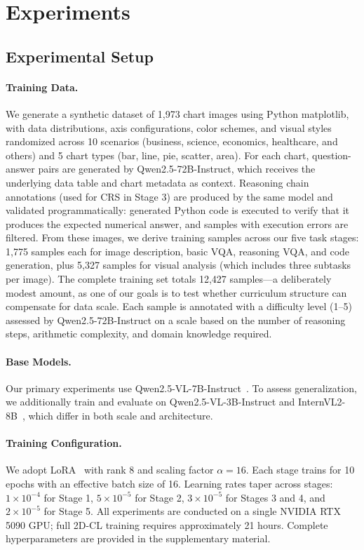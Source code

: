 ﻿\documentclass[journal]{IEEEtran}
\newcommand{\method}{2D-CL}
\newcommand{\crs}{CRS}
\begin{document}
\section{Experiments}
\subsection{Experimental Setup}
\label{sec:setup}
\paragraph{Training Data.}
We generate a synthetic dataset of 1,973 chart images using Python matplotlib, with data distributions, axis configurations, color schemes, and visual styles randomized across 10 scenarios (business, science, economics, healthcare, and others) and 5 chart types (bar, line, pie, scatter, area). For each chart, question-answer pairs are generated by Qwen2.5-72B-Instruct, which receives the underlying data table and chart metadata as context. Reasoning chain annotations (used for \crs{} in Stage 3) are produced by the same model and validated programmatically: generated Python code is executed to verify that it produces the expected numerical answer, and samples with execution errors are filtered. From these images, we derive training samples across our five task stages: 1,775 samples each for image description, basic VQA, reasoning VQA, and code generation, plus 5,327 samples for visual analysis (which includes three subtasks per image). The complete training set totals 12,427 samples---a deliberately modest amount, as one of our goals is to test whether curriculum structure can compensate for data scale. Each sample is annotated with a difficulty level (1--5) assessed by Qwen2.5-72B-Instruct on a scale based on the number of reasoning steps, arithmetic complexity, and domain knowledge required.

\paragraph{Base Models.}
Our primary experiments use Qwen2.5-VL-7B-Instruct~\cite{bai2023qwen}. To assess generalization, we additionally train and evaluate on Qwen2.5-VL-3B-Instruct and InternVL2-8B~\cite{chen2024internvl}, which differ in both scale and architecture.

\paragraph{Training Configuration.}
We adopt LoRA~\cite{hu2022lora} with rank 8 and scaling factor $\alpha=16$. Each stage trains for 10 epochs with an effective batch size of 16. Learning rates taper across stages: $1\times10^{-4}$ for Stage 1, $5\times10^{-5}$ for Stage 2, $3\times10^{-5}$ for Stages 3 and 4, and $2\times10^{-5}$ for Stage 5. All experiments are conducted on a single NVIDIA RTX 5090 GPU; full \method{} training requires approximately 21 hours. Complete hyperparameters are provided in the supplementary material.
\end{document}
